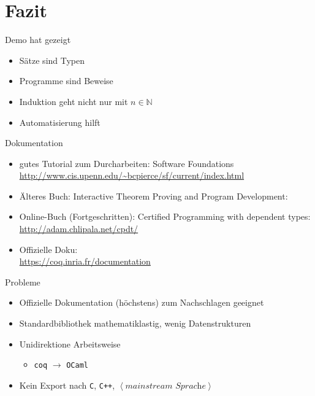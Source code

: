 \documentclass[aspectratio=169]{beamer}
\begin{document}
\section{Fazit}
\begin{frame}
  \begin{center}
    \Large{Demo hat gezeigt}
  \end{center}
  \begin{itemize}
  \item Sätze sind Typen
  \item Programme sind Beweise
  \item Induktion geht nicht nur mit $n\in\mathbb{N}$
  \item Automatisierung hilft
  \end{itemize}
\end{frame}
\begin{frame}
  \begin{center}
    \Large{Dokumentation}
  \end{center}
  \begin{itemize}
  \item gutes Tutorial zum Durcharbeiten: Software Foundations\\
    \qquad \url{http://www.cis.upenn.edu/~bcpierce/sf/current/index.html}
  \item Älteres Buch: Interactive Theorem Proving and Program Development:\\
  \item Online-Buch (Fortgeschritten): Certified Programming with dependent types:\\
    \qquad \url{http://adam.chlipala.net/cpdt/}
  \item Offizielle Doku:\\
    \qquad \url{https://coq.inria.fr/documentation}
  \end{itemize}
\end{frame}
\begin{frame}
  \begin{center}
    \Large{Probleme}
  \end{center}
  \begin{itemize}
  \item Offizielle Dokumentation (höchstens) zum Nachschlagen geeignet
  \item Standardbibliothek mathematiklastig, wenig Datenstrukturen
  \item Unidirektione Arbeitsweise 
    \begin{itemize}
    \item \texttt{coq} $\longrightarrow$ \texttt{OCaml}
    \end{itemize}
  \item Kein Export nach \texttt{C}, \texttt{C++}, $\left<\textit{mainstream Sprache}\right>$
  \end{itemize}
\end{frame} %
\end{document}
